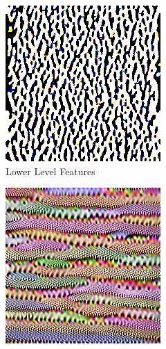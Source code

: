 \begin{figure}[htbp]
    \captionsetup[subfigure]{justification=centering}
    \centering
    \begin{subfigure}[b]{0.25\textwidth} %
        \centering
        \includegraphics[width=\textwidth]{figures/featurelayersviz/low_channel.png}
        \caption{Lower Level Features}
    \end{subfigure}
    \hspace{0.05\textwidth} %
    \begin{subfigure}[b]{0.25\textwidth} %
        \centering
        \includegraphics[width=\textwidth]{figures/featurelayersviz/medium_channel.png}

\end{subfigure}
\end{figure}
